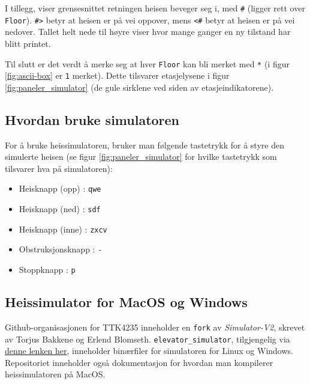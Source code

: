 I tillegg, viser grensesnittet retningen heisen beveger seg i, med \verb|#| (ligger rett over \verb|Floor|). \verb|#>| betyr at heisen er på vei oppover, mens \verb|<#| betyr at heisen er på vei nedover. Tallet helt nede til høyre viser hvor mange ganger en ny tilstand har blitt printet.

Til slutt er det verdt å merke seg at hver \verb|Floor| kan bli merket med \verb|*| (i figur \ref{fig:ascii-box} er \verb|1| merket). Dette tilsvarer etasjelysene i figur \ref{fig:paneler_simulator} (de gule sirklene ved siden av etasjeindikatorene).



\subsection{Hvordan bruke simulatoren}
For å bruke heissimulatoren, bruker man følgende tastetrykk for å styre den simulerte heisen (se figur \ref{fig:paneler_simulator} for hvilke tastetrykk som tilsvarer hva på simulatoren):

\begin{itemize}
    \item Heisknapp (opp)   : \verb|qwe|
    \item Heisknapp (ned)   : \verb|sdf|
    \item Heisknapp (inne)  : \verb|zxcv|
    \item Obstruksjonsknapp : \verb|-|
    \item Stoppknapp        : \verb|p|
\end{itemize}

\subsection{Heissimulator for MacOS og Windows}
Github-organisasjonen for TTK4235 inneholder en \verb|fork| av {\it Simulator-V2}, skrevet av Torjus Bakkene og Erlend Blomseth. \verb|elevator_simulator|, tilgjengelig via \href{https://github.com/ITK-TTK4235/elevator_simulator}{denne lenken her}, inneholder binærfiler for simulatoren for Linux og Windows. Repositoriet inneholder også dokumentasjon for hvordan man kompilerer heissimulatoren på MacOS. 

\clearpage

